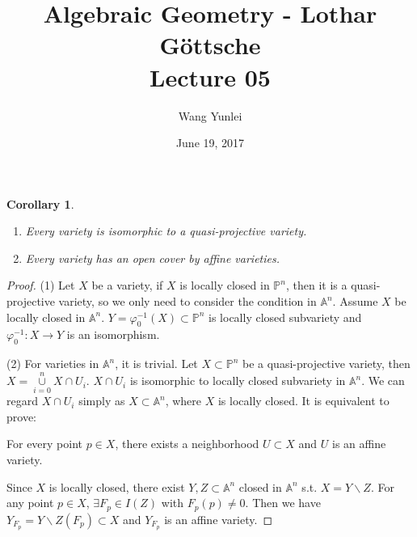 \documentclass{amsart}
\theoremstyle{plain}
\newtheorem{corollary}{Corollary}
\theoremstyle{definition}
\theoremstyle{remark}
\numberwithin{equation}{section}
\begin{document}
\title[Complete-simple distributive lattices]
{Algebraic Geometry - Lothar G\"{o}ttsche \\
	Lecture 05}
\author{Wang Yunlei}
\date{June 19, 2017}
 
\maketitle
\begin{corollary}
	\begin{enumerate}
		\item Every variety is isomorphic to a quasi-projective variety.
		\item Every variety has an open cover by affine varieties.
	\end{enumerate}
\end{corollary}
\begin{proof}
	(1) Let $ X $ be a variety, if $ X $ is locally closed in $ \mathbb{P}^n $,
	then it is  a quasi-projective variety, so we only need to consider the condition in $ \mathbb{A}^n $. Assume $ X $ be locally closed in $ \mathbb{A}^n $. $ Y=\varphi ^{-1}_0 (X) \subset \mathbb{P}^n$ is locally closed subvariety and $ \varphi^{-1}_0 :X\to Y $ is an isomorphism.
	
	(2) For varieties in $ \mathbb{A}^n $, it is trivial. Let $ X\subset \mathbb{P}^n $ be a quasi-projective variety, then $ X=\mathop{\cup}\limits_{i=0}^{n}X\cap U_i $. $ X\cap U_i $ is isomorphic to locally closed subvariety in $ \mathbb{A}^n $. We can regard $ X\cap U_i $ simply as $ X \subset \mathbb{A}^n$, where $ X $ is locally closed. It is equivalent to prove:
	\begin{center}
		For every point $ p\in X $, there exists a neighborhood $ U\subset X $ and $ U $ is an affine variety.
	\end{center}
	Since $ X $ is locally closed, there exist $ Y,Z\subset \mathbb{A}^n $ closed in $ \mathbb{A}^n $ s.t. $ X=Y\backslash Z $. For any point $ p\in X $, $ \exists F_p\in I(Z) $ with $ F_p(p)\neq 0 $. Then we have $ Y_{F_p}=Y\backslash Z(F_p)\subset X $ and $ Y_{F_p} $ is an affine variety.
\end{proof}
\end{document}
